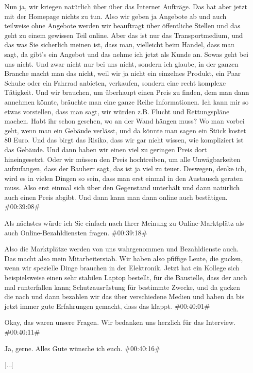 \begin{description}
\Andre Nun ja, wir kriegen natürlich über über das Internet Aufträge. Das hat aber jetzt mit der Homepage nichts zu tun. Also wir geben ja Angebote ab und auch teilweise ohne Angebote werden wir beauftragt über öffentliche Stellen und das geht zu einem gewissen Teil online. Aber das ist nur das Transportmedium, und das was Sie sicherlich meinen ist, dass man, vielleicht beim Handel, dass man sagt, da gibt's ein Angebot und das nehme ich jetzt als Kunde an. Sowas geht bei uns nicht. Und zwar nicht nur bei uns nicht, sondern ich glaube, in der ganzen Branche macht man das nicht, weil wir ja nicht ein einzelnes Produkt, ein Paar Schuhe oder ein Fahrrad anbieten, verkaufen, sondern eine recht komplexe Tätigkeit. Und wir brauchen, um überhaupt einen Preis zu finden, dem man dann annehmen könnte, bräuchte man eine ganze Reihe Informationen. Ich kann mir so etwas vorstellen, dass man sagt, wir würden z.B. Flucht und Rettungspläne machen. Habt ihr schon gesehen, wo an der Wand hängen muss? Wo man vorbei geht, wenn man ein Gebäude verlässt, und da könnte man sagen ein Stück kostet 80 Euro. Und das birgt das Risiko, dass wir gar nicht wissen, wie kompliziert ist das Gebäude. Und dann haben wir einen viel zu geringen Preis dort hineingesetzt. Oder wir müssen den Preis hochtreiben, um alle Unwägbarkeiten aufzufangen, dass der Bauherr sagt, das ist ja viel zu teuer. Deswegen, denke ich, wird es in vielen Dingen so sein, dass man erst einmal in den Austausch geraten muss. Also erst einmal sich über den Gegenstand unterhält und dann natürlich auch einen Preis abgibt. Und dann kann man dann online auch bestätigen. \#00:39:08\#

\Toni Als nächstes würde ich Sie einfach nach Ihrer Meinung zu Online-Marktplätz als auch Online-Bezahldiensten fragen. \#00:39:18\#

\Andre Also die Marktplätze werden von uns wahrgenommen und Bezahldienste auch. Das macht also mein Mitarbeiterstab. Wir haben also pfiffige Leute, die gucken, wenn wir spezielle Dinge brauchen in der Elektronik. Jetzt hat ein Kollege sich beispielsweise einen sehr stabilen Laptop bestellt, für die Baustelle, dass der auch mal runterfallen kann; Schutzausrüstung für bestimmte Zwecke, und da gucken die nach und dann bezahlen wir das über verschiedene Medien und haben da bis jetzt immer gute Erfahrungen gemacht, dass das klappt. \#00:40:01\#

\Fabian Okay, das waren unsere Fragen. Wir bedanken uns herzlich für das Interview. \#00:40:11\#

\Andre Ja, gerne. Alles Gute wünsche ich euch. \#00:40:16\#

[...]

\end{description}

\normalsize
